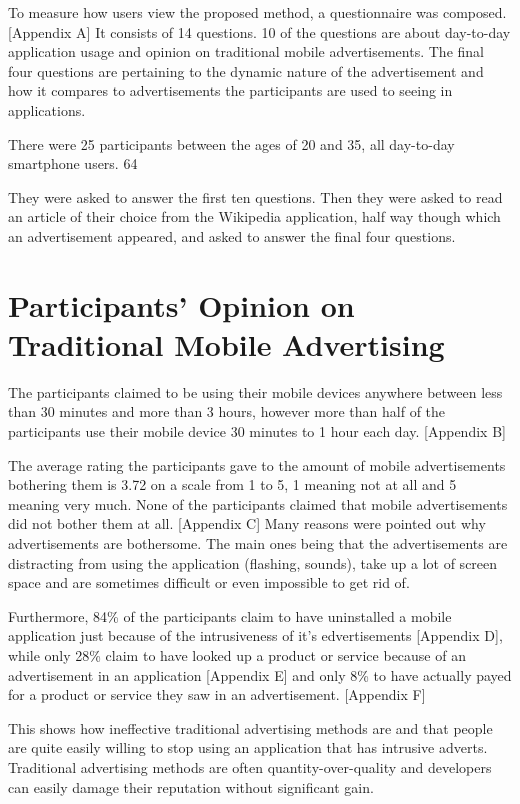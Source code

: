 To measure how users view the proposed method, a questionnaire was composed. [Appendix A] It consists of 14 questions. 10 of the questions are about day-to-day application usage and opinion on traditional mobile advertisements. The final four questions are pertaining to the dynamic nature of the advertisement and how it compares to advertisements the participants are used to seeing in applications.

There were 25 participants between the ages of 20 and 35, all day-to-day smartphone users. 64%

They were asked to answer the first ten questions. Then they were asked to read an article of their choice from the Wikipedia application, half way though which an advertisement appeared, and asked to answer the final four questions.

\section{Participants' Opinion on Traditional Mobile Advertising}

The participants claimed to be using their mobile devices anywhere between less than 30 minutes and more than 3 hours, however more than half of the participants use their mobile device 30 minutes to 1 hour each day. [Appendix B]

The average rating the participants gave to the amount of mobile advertisements bothering them is 3.72 on a scale from 1 to 5, 1 meaning not at all and 5 meaning very much. None of the participants claimed that mobile advertisements did not bother them at all. [Appendix C] Many reasons were pointed out why advertisements are bothersome. The main ones being that the advertisements are distracting from using the application (flashing, sounds), take up a lot of screen space and are sometimes difficult or even impossible to get rid of.

Furthermore, 84\% of the participants claim to have uninstalled a mobile application just because of the intrusiveness of it's edvertisements [Appendix D], while only 28\% claim to have looked up a product or service because of an advertisement in an application [Appendix E] and only 8\% to have actually payed for a product or service they saw in an advertisement. [Appendix F]

This shows how ineffective traditional advertising methods are and that people are quite easily willing to stop using an application that has intrusive adverts. Traditional advertising methods are often quantity-over-quality and developers can easily damage their reputation without significant gain.

